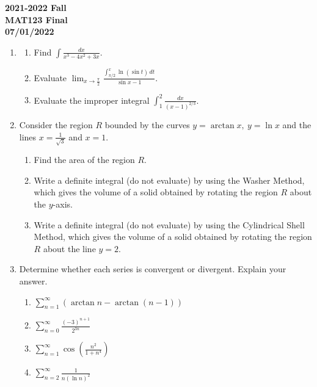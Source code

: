 \documentclass[a4paper, 12pt]{article}
\begin{document}
\pagestyle{empty}

\begin{center}
\textbf{2021-2022 Fall\\MAT123 Final\\07/01/2022}
\end{center}

\begin{enumerate}[leftmargin=*,label=\textbf{\arabic*.}]
\item \begin{enumerate}[leftmargin=*,label=\textbf{\alph*.}]
\item Find $\displaystyle\int\frac{dx}{x^3-4x^2+3x}$.

\item Evaluate $\displaystyle\lim_{x\to\textstyle\frac\pi2}\frac{\displaystyle\int_{\pi/2}^x\ln(\sin t)\,dt}{\sin x-1}$.

\item Evaluate the improper integral  $\displaystyle\int_1^2\frac{dx}{(x-1)^{2/3}}$.
\end{enumerate}

\item Consider the region $R$ bounded by the curves $y=\arctan x,\:y=\ln x$ and the lines $\displaystyle x=\frac1{\sqrt3}$ and $x=1$.

\begin{enumerate}[leftmargin=*,label=\textbf{\alph*.}]
\item Find the area of the region $R$. 

\item Write a definite integral (do not evaluate) by using the Washer Method, which gives the volume of a solid obtained by rotating the region $R$ about the $y$-axis.

\item Write a definite integral (do not evaluate) by using the Cylindrical Shell Method, which gives the volume of a solid obtained by rotating the region $R$ about the line $y=2$.
\end{enumerate}

\item Determine whether each series is convergent or divergent. Explain your answer.
\begin{enumerate}[leftmargin=*,label=\textbf{\alph*.}]
\item $\displaystyle\sum_{n=1}^\infty\left(\arctan n-\arctan(n-1)\right)$
\item $\displaystyle\sum_{n=0}^\infty\frac{(-3)^{n+1}}{2^{3n}}$
\item $\displaystyle\sum_{n=1}^\infty\cos\left(\frac{n^2}{1+n^4}\right)$
\item $\displaystyle\sum_{n=2}^\infty\frac1{n(\ln n)^2}$
\end{enumerate}
\end{enumerate}
\end{document}
